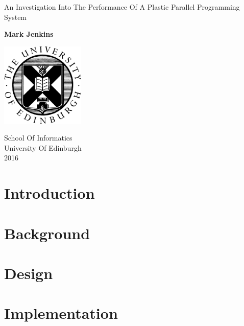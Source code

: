 \documentclass{report}
\begin{document}
\begin{titlepage}
    \begin{center}
        \vspace*{1cm}
        
        \Huge
        An Investigation Into The Performance Of A Plastic Parallel Programming System
        
        \vspace{1.5cm}
        
        \large
        \textbf{Mark Jenkins}
        
        \vspace{3.5cm}

        \includegraphics[width=0.3\textwidth]{university}

        \vspace{3.5cm}
        
        School Of Informatics\\
        University Of Edinburgh\\
        2016
        
    \end{center}
\end{titlepage}



\tableofcontents

\newpage

\chapter{Introduction}


\chapter{Background}


\chapter{Design}


\chapter{Implementation}

\end{document}
